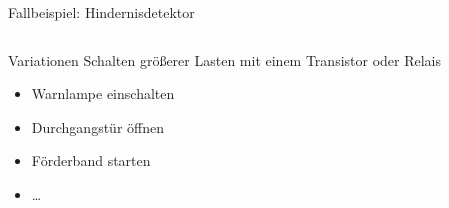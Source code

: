 {\begin{frame}[allowframebreaks]{Fallbeispiel: Hindernisdetektor}
\begin{columns}
\begin{block}{Variationen}
            \medskip
            Schalten größerer Lasten mit einem Transistor oder Relais

            {
                \footnotesize
                \begin{itemize}
                    \item Warnlampe einschalten
                    \item Durchgangstür öffnen
                    \item Förderband starten
                    \item \ldots
                \end{itemize}
            }
        \end{block}
    \end{columns}
\end{frame}
}

